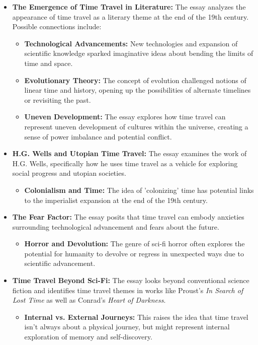 \documentclass[11pt,fleqn]{book}
\begin{document}
\begin{itemize}
\item \textbf{The Emergence of Time Travel in Literature:} The essay analyzes the appearance of time travel as a literary theme at the end of the 19th century. Possible connections include:
    \begin{itemize}
        \item \textbf{Technological Advancements:} New technologies and expansion of scientific knowledge sparked imaginative ideas about bending the limits of time and space.
        \item \textbf{Evolutionary Theory:} The concept of evolution challenged notions of linear time and history, opening up the possibilities of alternate timelines or revisiting the past.
        \item \textbf{Uneven Development:} The essay explores how time travel can represent uneven development of cultures within the universe, creating a sense of power imbalance and potential conflict. 
    \end{itemize}

\item \textbf{H.G. Wells and Utopian Time Travel:}  The essay examines the work of H.G. Wells, specifically how he uses time travel as a vehicle for exploring social progress and utopian societies. 
    \begin{itemize}
        \item  \textbf{Colonialism and Time:} The idea of 'colonizing' time has potential links to the imperialist expansion at the end of the 19th century.
    \end{itemize}

\item \textbf{The Fear Factor:} The essay posits that time travel can embody anxieties surrounding technological advancement and fears about the future.
    \begin{itemize}
        \item \textbf{Horror and Devolution:}  The genre of sci-fi horror often explores the potential for humanity to devolve or regress in unexpected ways due to scientific advancement. 
    \end{itemize}

\item \textbf{Time Travel Beyond Sci-Fi:} The essay looks beyond conventional science fiction and identifies time travel themes in works like Proust's \textit{In Search of Lost Time} as well as Conrad's \textit{Heart of Darkness}. 
    \begin{itemize}
        \item \textbf{Internal vs. External Journeys:} This raises the idea that time travel isn't always about a physical journey, but might represent internal exploration of memory and self-discovery.
    \end{itemize}


\end{itemize}
\end{document}
